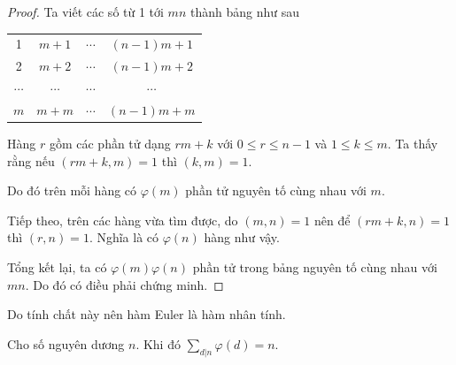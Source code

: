 \begin{proof}
    Ta viết các số từ 1 tới $mn$ thành bảng như sau

    \begin{table}
        \centering
        \begin{tabular}{c c c c}
            1 & $m+1$ & $\cdots$ & $(n-1)m + 1$ \\
            2 & $m+2$ & $\cdots$ & $(n-1)m + 2$ \\
            $\cdots$ & $\cdots$ & $\cdots$ & $\cdots$ \\
            $m$ & $m+m$ & $\cdots$ & $(n-1)m + m$
        \end{tabular}
    \end{table}
    
    Hàng $r$ gồm các phần tử dạng $r m + k$ với $0 \leqslant r \leqslant n-1$ và $1 \leqslant k \leqslant m$.  Ta thấy rằng nếu $(rm + k, m) = 1$ thì $(k, m) = 1$.

    Do đó trên mỗi hàng có $\varphi(m)$ phần tử nguyên tố cùng nhau với $m$.

    Tiếp theo, trên các hàng vừa tìm được, do $(m, n) = 1$ nên để $(rm + k, n) = 1$ thì $(r, n) = 1$. Nghĩa là có $\varphi(n)$ hàng như vậy.

    Tổng kết lại, ta có $\varphi(m) \varphi(n)$ phần tử trong bảng nguyên tố cùng nhau với $mn$. Do đó có điều phải chứng minh.
\end{proof}

Do tính chất này nên hàm Euler là hàm nhân tính.

\begin{remark}
    Cho số nguyên dương $n$. Khi đó $\displaystyle{\sum_{d | n} \varphi(d) = n}$.
\end{remark}

